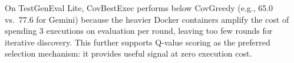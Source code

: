 On TestGenEval Lite, CovBestExec performs below CovGreedy (e.g., 65.0 vs.\ 77.6 for Gemini) because the heavier Docker containers amplify the cost of spending 3 executions on evaluation per round, leaving too few rounds for iterative discovery. This further supports Q-value scoring as the preferred selection mechanism: it provides useful signal at zero execution cost.
